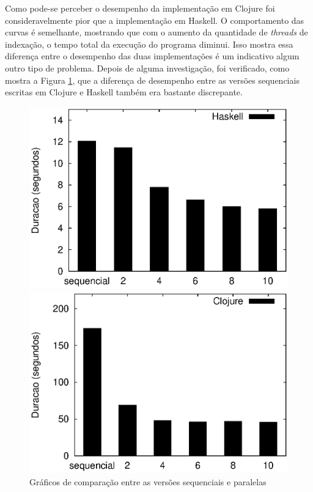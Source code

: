 Como pode-se perceber o desempenho da implementação em Clojure foi consideravelmente pior que a implementação em Haskell. O comportamento das curvas é semelhante, mostrando que com o aumento da quantidade de \emph{threads} de indexação, o tempo total da execução do programa diminui. Isso mostra essa diferença entre o desempenho das duas implementações é um indicativo algum outro tipo de problema. Depois de alguma investigação, foi verificado, como mostra a Figura \ref{fig:clj-hs}, que a diferença de desempenho entre as versões sequenciais escritas em Clojure e Haskell também era bastante discrepante.

\begin{figure}[!h]
 \begin{minipage}{0.5\textwidth}
  \centering
  \includegraphics[scale=0.63]{imagens/haskell.eps}
 \end{minipage}
 \begin{minipage}{0.5\textwidth}
  \includegraphics[scale=0.63]{imagens/clojure.eps}
 \end{minipage}
 \caption{Gráficos de comparação entre as versões sequenciais e paralelas}
 \label{fig:clj-hs}
\end{figure}

